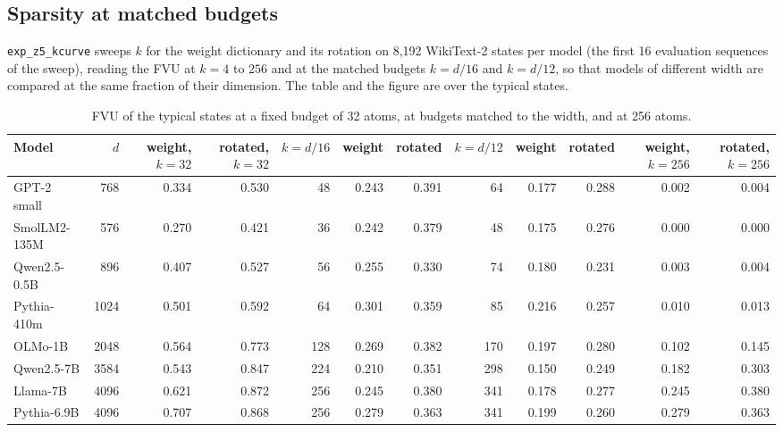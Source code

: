 \subsection{Sparsity at matched budgets}\label{app:z5}
\texttt{exp\_z5\_kcurve} sweeps $k$ for the weight dictionary and its rotation on 8,192 WikiText-2 states per model (the first 16 evaluation sequences of the sweep), reading the FVU at $k=4$ to $256$ and at the matched budgets $k=d/16$ and $k=d/12$, so that models of different width are compared at the same fraction of their dimension. The table and the figure are over the typical states.
\begin{table}[H]\centering\scriptsize
\caption{FVU of the typical states at a fixed budget of 32 atoms, at budgets matched to the width, and at 256 atoms.}\label{app:z5-table}
\begin{adjustbox}{max width=\linewidth}
\begin{tabular}{lrrrrrrrrrrr}\toprule
Model & $d$ & weight, $k=32$ & rotated, $k=32$ & $k=d/16$ & weight & rotated & $k=d/12$ & weight & rotated & weight, $k=256$ & rotated, $k=256$ \\ \midrule
GPT-2 small & 768 & 0.334 & 0.530 & 48 & 0.243 & 0.391 & 64 & 0.177 & 0.288 & 0.002 & 0.004 \\
SmolLM2-135M & 576 & 0.270 & 0.421 & 36 & 0.242 & 0.379 & 48 & 0.175 & 0.276 & 0.000 & 0.000 \\
Qwen2.5-0.5B & 896 & 0.407 & 0.527 & 56 & 0.255 & 0.330 & 74 & 0.180 & 0.231 & 0.003 & 0.004 \\
Pythia-410m & 1024 & 0.501 & 0.592 & 64 & 0.301 & 0.359 & 85 & 0.216 & 0.257 & 0.010 & 0.013 \\
OLMo-1B & 2048 & 0.564 & 0.773 & 128 & 0.269 & 0.382 & 170 & 0.197 & 0.280 & 0.102 & 0.145 \\
Qwen2.5-7B & 3584 & 0.543 & 0.847 & 224 & 0.210 & 0.351 & 298 & 0.150 & 0.249 & 0.182 & 0.303 \\
Llama-7B & 4096 & 0.621 & 0.872 & 256 & 0.245 & 0.380 & 341 & 0.178 & 0.277 & 0.245 & 0.380 \\
Pythia-6.9B & 4096 & 0.707 & 0.868 & 256 & 0.279 & 0.363 & 341 & 0.199 & 0.260 & 0.279 & 0.363 \\
\bottomrule\end{tabular}\end{adjustbox}
\end{table}
